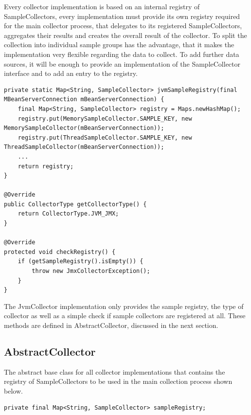 Every collector implementation is based on an internal registry of SampleCollectors, every implementation must provide its
own registry required for the main collector process, that delegates to its registered SampleCollectors,
aggregates their results and creates the overall result of the collector. To split the collection into individual sample groups has
the advantage, that it makes the implementation very flexible regarding the data to collect. To add further data sources, it
will be enough to provide an implementation of the SampleCollector interface and to add an entry to the registry.

\begin{lstlisting}[caption={Sample registry for "JvmCollector"}, captionpos=b, label={lst:jvmsampleregistry}]
private static Map<String, SampleCollector> jvmSampleRegistry(final MBeanServerConnection mBeanServerConnection) {
    final Map<String, SampleCollector> registry = Maps.newHashMap();
    registry.put(MemorySampleCollector.SAMPLE_KEY, new MemorySampleCollector(mBeanServerConnection));
    registry.put(ThreadSampleCollector.SAMPLE_KEY, new ThreadSampleCollector(mBeanServerConnection));
    ...
    return registry;
}

@Override
public CollectorType getCollectorType() {
    return CollectorType.JVM_JMX;
}

@Override
protected void checkRegistry() {
    if (getSampleRegistry().isEmpty()) {
        throw new JmxCollectorException();
    }
}
\end{lstlisting}

The JvmCollector implementation only provides the sample registry, the type of collector as well as a simple check if sample collectors
are registered at all. These methods are defined in AbstractCollector, discussed in the next section.

\subsection{AbstractCollector}

The abstract base class for all collector implementations that contains the registry of SampleCollectors to be used in the main
collection process shown below.

\begin{lstlisting}[caption={"AbstractCollector" sample registry}, captionpos=b, label={lst:abstract-collectorsample-registry}]
private final Map<String, SampleCollector> sampleRegistry;
\end{lstlisting}


